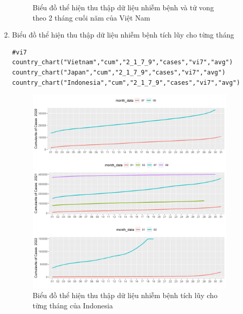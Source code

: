 \documentclass[a4paper]{article}
\theoremstyle{definition}
\begin{document}
\begin{enumerate}[i)]
\begin{enumerate}[1)]
\begin{figure}[htp]
		    \caption{Biểu đồ thể hiện thu thập dữ liệu nhiễm bệnh và tử vong theo 2 tháng cuối năm của Việt Nam}
		    \label{fig:my_label}
		 \end{figure}
		 \newpage
    \item Biểu đồ thể hiện thu thập dữ liệu nhiễm bệnh tích lũy cho từng tháng
    \begin{lstlisting}[frame=single]  
#vi7
country_chart("Vietnam","cum","2_1_7_9","cases","vi7","avg")
country_chart("Japan","cum","2_1_7_9","cases","vi7","avg")
country_chart("Indonesia","cum","2_1_7_9","cases","vi7","avg")
		\end{lstlisting}
		\begin{figure}[htp]
		    \centering
		    \includegraphics[scale = 0.7]{Images/VI/vi7 Indonesia .jpeg}
		    \caption{Biểu đồ thể hiện thu thập dữ liệu nhiễm bệnh tích lũy cho từng tháng của Indonesia}
		    \label{fig:my_label}
		\end{figure}
		\begin{figure}[htp]
		    \centering

\end{figure}
\end{enumerate}
\end{enumerate}
\end{document}
